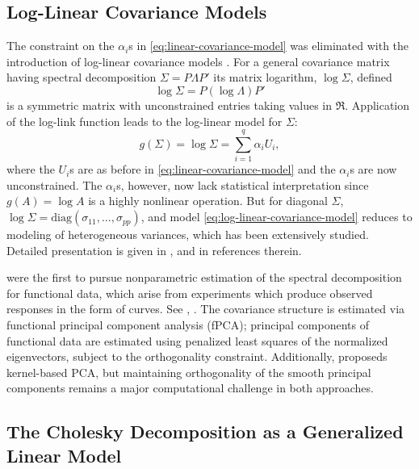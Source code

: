 \subsection{Log-Linear Covariance Models} \label{log-linear-glms}

The constraint on the $\alpha_i$s in \eqref{eq:linear-covariance-model} was eliminated with the introduction of log-linear covariance models \citep{chiu1996matrix,pinheiro1996unconstrained}. For a general covariance matrix having spectral decomposition $\Sigma = P \Lambda P'$ its matrix logarithm, $\log\Sigma$, defined 
\[
\log \Sigma = P\left( \log\Lambda \right)P'
\]
\noindent
is a symmetric matrix with unconstrained entries taking values in $\Re$. Application of the log-link function leads to the log-linear model for $\Sigma$:
\begin{equation} \label{eq:log-linear-covariance-model}
g\left(\Sigma\right)  = \log\Sigma  = \sum_{i = 1}^q \alpha_i U_i, 
\end{equation}
\noindent
where the $U_i$s are as before in \eqref{eq:linear-covariance-model} and the $\alpha_i$s are now unconstrained. The $\alpha_i$s, however, now lack statistical interpretation since $g\left(A\right) = \log A$ is a highly nonlinear operation. But for diagonal $\Sigma$, $\log \Sigma = \mbox{diag}\left(\sigma_{11},\dots, \sigma_{pp}\right)$, and model \eqref{eq:log-linear-covariance-model} reduces to modeling of heterogeneous variances, which has been extensively studied. Detailed presentation is given in \cite{carroll1988transformation}, \cite{verbyla1993modelling} and in references therein. 

\bigskip

\cite{rice1991estimating} were the first to pursue nonparametric estimation of the spectral decomposition for functional data, which arise from experiments which produce observed responses in the form of curves. See \cite{ramsay2006functional}, \cite{ramsay2007applied}. The covariance structure is estimated via functional principal component analysis (fPCA); principal components of functional data are estimated using penalized least squares of the normalized eigenvectors, subject to the orthogonality constraint. Additionally, \cite{boente2000kernel} proposeds kernel-based PCA, but maintaining orthogonality of the smooth principal components remains a major computational challenge in both approaches.

\subsection{The Cholesky Decomposition as a Generalized Linear Model}

